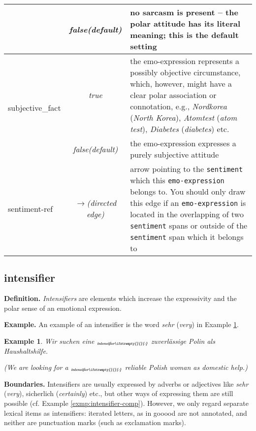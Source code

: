 \documentclass[11pt,a4paper]{article}
\newlength{\clmnwidth}
\theoremstyle{mytheoremstyle}
\newtheorem{exmp}{Example}[section]
\newcommand{\mtag}[2]{{\upshape[\emph{#2}\upshape]$_{\textrm{\bfseries\emph{\tiny
        #1}}}$}}
\newcommand{\intensifier}[2][]{\mtag{in\-ten\-si\-fier\ifstrempty{#1}{}{:#1}}{#2}}
\begin{document}
\begin{center}
\begin{table}[ht]
\begin{tabular}{|l|c|p{0.935\clmnwidth}|}
      & \textit{false\newline(default)} & no sarcasm is present -- the
      polar attitude has its literal meaning; this is the default
      setting\\\hline


      \multirow{2}{*}{subjective\_fact} & \textit{true} & the
      emo-expression represents a possibly objective circumstance,
      which, however, might have a clear polar association or
      connotation, e.g., \emph{Nordkorea} (\emph{North Korea}),
      \emph{Atomtest} (\emph{atom test}), \emph{Diabetes}
      (\emph{diabetes}) etc.\\\cline{2-3}

      & \textit{false\newline(default)} & the emo-expression expresses
      a purely subjective attitude\\\hline


      sentiment-ref & \textit{$\longrightarrow$\newline(directed
        edge)} & arrow pointing to the \texttt{sentiment} which this
      \texttt{emo-expression} belongs to.  You should only draw this
      edge if an \texttt{emo-expression} is located in the overlapping
      of two \texttt{sentiment} spans or outside of the
      \texttt{sentiment} span which it belongs to\\\hline
    \end{tabular}
    \label{tbl:emo-expression}
  \end{table}
\end{center}

\subsection{intensifier}
\noindent\textbf{Definition.} \emph{Intensifiers} are elements which increase
the expressivity and the polar sense of an emotional expression.

\noindent\textbf{Example.} An example of an intensifier is the word
\textit{sehr} (\textit{very}) in Example \ref{exmp:intensifier}.
\begin{exmp}
  Wir suchen eine \intensifier{sehr} zuverl\"assige Polin als
  Haushaltshilfe.

  (We are looking for a \intensifier{very} reliable Polish woman as
  domestic help.)\label{exmp:intensifier}
\end{exmp}
\noindent\textbf{Boundaries.} Intensifiers are usually expressed by
adverbs or adjectives like \textit{sehr} (\textit{very}), sicherlich
(\textit{certainly}) etc., but other ways of expressing them are still
possible (cf. Example \ref{exmp:intensifier-comp}).  However, we only
regard separate lexical items as intensifiers: iterated letters, as in
gooood are not annotated, and neither are punctuation marks (such as
exclamation marks).
\end{document}
